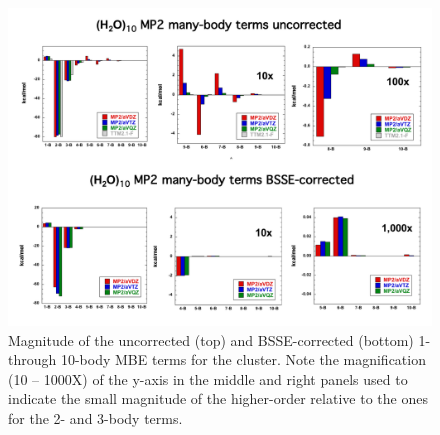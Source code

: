 \begin{figure}[t]
\uwsinglespace
\centering
\includegraphics[width=.9\textwidth]{Figures/Chapter_2/W10_MP2_MB.pdf}
\begin{spacing}{1.0}
\caption[Magnitude of the uncorrected (top) and BSSE-corrected (bottom) 1- through 10-body MBE terms for the  cluster. Note the magnification (10 – 1000X) of the y-axis in the middle and right panels used to indicate the small magnitude of the higher-order relative to the ones for the 2- and 3-body terms.]{Magnitude of the uncorrected (top) and BSSE-corrected (bottom) 1- through 10-body MBE terms for the  cluster. Note the magnification (10 – 1000X) of the y-axis in the middle and right panels used to indicate the small magnitude of the higher-order relative to the ones for the 2- and 3-body terms.}\label{fig:MBE_I_F2}
\end{spacing}
\end{figure}